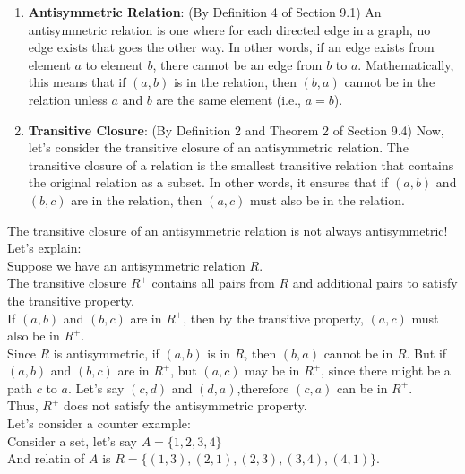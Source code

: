\documentclass[12pt]{article}
\begin{document}
\begin{enumerate}
    \item \textbf{Antisymmetric Relation}:
(By Definition 4 of Section 9.1) An antisymmetric relation is one where for each directed edge in a graph, no edge exists that goes the other way. In other words, if an edge exists from element \( a \) to element \( b \), there cannot be an edge from \( b \) to \( a \). Mathematically, this means that if \( (a, b) \) is in the relation, then \( (b, a) \) cannot be in the relation unless \( a \) and \( b \) are the same element (i.e., \( a = b \)).
    \item \textbf{Transitive Closure}:
(By Definition 2 and Theorem 2 of Section 9.4) Now, let's consider the transitive closure of an antisymmetric relation. The transitive closure of a relation is the smallest transitive relation that contains the original relation as a subset. In other words, it ensures that if \( (a, b) \) and \( (b, c) \) are in the relation, then \( (a, c) \) must also be in the relation.
\end{enumerate}
The transitive closure of an antisymmetric relation is not always antisymmetric! Let's explain:\\

Suppose we have an antisymmetric relation \( R \). \\
The transitive closure \( R^+ \) contains all pairs from \( R \) and additional pairs to satisfy the transitive property.\\
If \( (a, b) \) and \( (b, c) \) are in \( R^+ \), then by the transitive property, \( (a, c) \) must also be in \( R^+ \).\\
Since \( R \) is antisymmetric, if \( (a, b) \) is in \( R \), then \( (b, a) \) cannot be in \( R \). But if \( (a, b) \) and \( (b, c) \) are in \( R^+ \), but \( (a, c) \) may be in \( R^+ \), since there might be a path \(c\) to \(a\). Let's say \((c,d)\) and \( (d,a)\),therefore \( (c, a) \) can be in \( R^+ \). \\
Thus, \( R^+ \) does not satisfy the antisymmetric property. \\

Let's consider a counter example: \\

Consider a set, let's say \(A= \{1, 2, 3, 4\} \) \\

And relatin of \(A\) is \( R = \{(1, 3),(2, 1),(2, 3),(3, 4),(4, 1)\}\). \\
\end{document}
